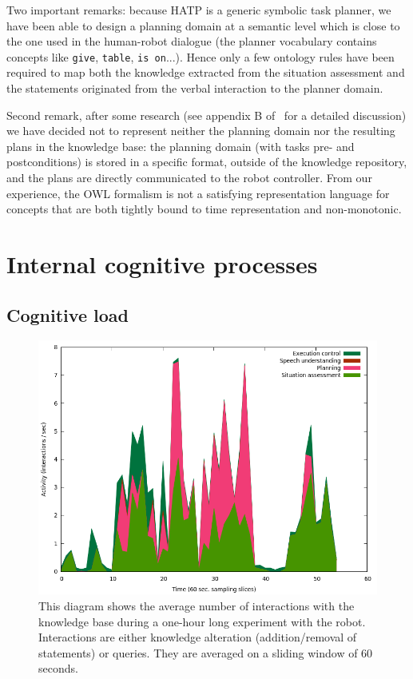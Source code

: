 \documentclass[letterpaper, 10 pt, conference]{ieeeconf}  %
\begin{document}
Two important remarks: because HATP is a generic symbolic task planner, we have
been able to design a planning domain at a semantic level which is close to the
one used in the human-robot dialogue (the planner vocabulary contains concepts
like \texttt{give}, \texttt{table}, \texttt{is on}...). Hence only a few
ontology rules have been required to map both the knowledge extracted from the
situation assessment and the statements originated from the verbal interaction
to the planner domain.

Second remark, after some research (see appendix B of~\cite{Lemaignan2012a} for
a detailed discussion)  we have decided not to represent neither the planning
domain nor the resulting plans in the knowledge base: the planning domain (with
tasks pre- and postconditions) is stored in a specific format, outside of the
knowledge repository, and the plans are directly communicated to the robot
controller. From our experience, the OWL formalism is not a satisfying
representation language for concepts that are both tightly bound to time
representation and non-monotonic.


\section{Internal cognitive processes}
\label{sect|intern}

\subsection{Cognitive load}

\begin{figure}
        \centering
        \includegraphics[width=\columnwidth]{figs/cognitive_load.png}
        \caption{This diagram shows the average number of interactions with the
        knowledge base during a one-hour long experiment with the robot.
        Interactions are either knowledge alteration (addition/removal of
        statements) or queries. They are averaged on a sliding window of 60 seconds.}
        \label{fig|cognitiveload}
\end{figure}
\end{document}
